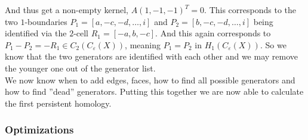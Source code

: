 \documentclass[11pt, a4paper, UKenglish]{article}
\begin{document}
    And thus get a non-empty kernel, $A(1,-1,-1)^T=0$. 
    This corresponds to the two $1$-boundaries $P_1=[a,-c,-d,\ldots,i]$ and $P_2=[b,-c,-d,\ldots,i]$ being identified via the $2$-cell $R_1=[-a,b,-c]$. 
    And this again corresponds to $P_1-P_2=-R_1\in C_2(C_\varepsilon(X))$, meaning $P_1 = P_2$ in $H_1(C_\varepsilon(X))$.
    So we know that the two generators are identified with each other and we may remove the younger one out of the generator list.\\
    We now know when to add edges, faces, how to find all possible generators and how to find ''dead'' generators.
    Putting this together we are now able to calculate the first persistent homology.

    \subsubsection{Optimizations}\label{subsec:optimizations}
\end{document}
